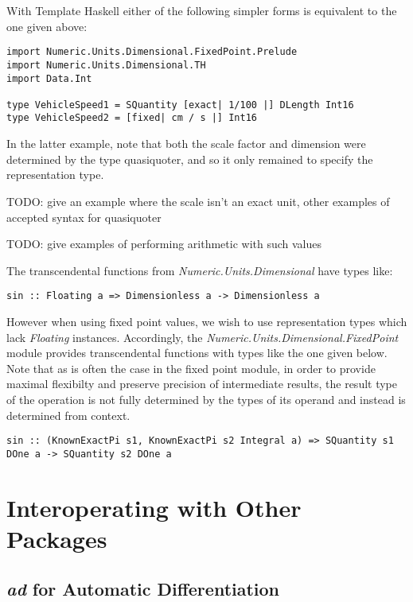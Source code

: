 \documentclass[11pt]{report}
\newcommand{\packagename}[1]{\textit{#1}}
\newcommand{\classname}[1]{\textit{#1}}
\newcommand{\modulename}[1]{\textit{#1}}
\begin{document}
With Template Haskell either of the following simpler forms is equivalent to the one given above:

\begin{lstlisting}
import Numeric.Units.Dimensional.FixedPoint.Prelude
import Numeric.Units.Dimensional.TH
import Data.Int

type VehicleSpeed1 = SQuantity [exact| 1/100 |] DLength Int16
type VehicleSpeed2 = [fixed| cm / s |] Int16
\end{lstlisting}

In the latter example, note that both the scale factor and dimension were determined by the type quasiquoter, and so it
only remained to specify the representation type.

TODO: give an example where the scale isn't an exact unit, other examples of accepted syntax for quasiquoter

TODO: give examples of performing arithmetic with such values

The transcendental functions from \modulename{Numeric.Units.Dimensional} have types like:

\begin{lstlisting}
sin :: Floating a => Dimensionless a -> Dimensionless a
\end{lstlisting}

However when using fixed point values, we wish to use representation types which lack \classname{Floating} instances. Accordingly,
the \modulename{Numeric.Units.Dimensional.FixedPoint} module provides transcendental functions with types like the one given below.
Note that as is often the case in the fixed point module, in order to provide maximal flexibilty and preserve precision of
intermediate results, the result type of the operation is not fully determined by the types of its operand and instead is
determined from context.

\begin{lstlisting}
sin :: (KnownExactPi s1, KnownExactPi s2 Integral a) => SQuantity s1 DOne a -> SQuantity s2 DOne a
\end{lstlisting}

\chapter{Interoperating with Other Packages}

\section{\packagename{ad} for Automatic Differentiation}
\end{document}

